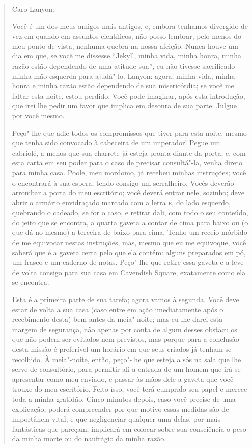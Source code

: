 \begin{quote}
Caro Lanyon:

Você é um dos meus amigos mais antigos, e, embora tenhamos divergido de
vez em quando em assuntos científicos, não posso lembrar, pelo menos do
meu ponto de vista, nenhuma quebra na nossa afeição. Nunca houve um dia
em que, se você me dissesse “Jekyll, minha vida, minha honra, minha
razão estão dependendo de uma atitude sua”, eu não tivesse sacrificado
minha mão esquerda para ajudá"-lo.  Lanyon: agora, minha vida, minha
honra e minha razão estão dependendo de sua misericórdia; se você me
faltar esta noite, estou perdido.  Você pode imaginar, após esta
introdução, que irei lhe pedir um favor que implica em desonra de sua
parte.  Julgue por você mesmo.

Peço"-lhe que adie todos os compromissos que tiver para esta noite, mesmo
que tenha sido convocado à cabeceira de um imperador!  Pegue um
cabriolé, a menos que sua charrete já esteja pronta diante da porta; e,
com esta carta em seu poder para o caso de precisar consultá"-la, venha
direto para minha casa.  Poole, meu mordomo, já recebeu minhas
instruções; você o encontrará à sua espera, tendo consigo um
serralheiro.  Vocês deverão arrombar a porta do meu escritório; você
deverá entrar nele, sozinho; deve abrir o armário envidraçado marcado
com a letra \textsc{e}, do lado esquerdo, quebrando o cadeado, se for o caso, e
retirar dali, com todo o seu conteúdo, do jeito que se encontra, a
quarta gaveta a contar de cima para baixo ou (o que dá no mesmo) a
terceira de baixo para cima.  Tenho um receio mórbido de me equivocar
nestas instruções, mas, mesmo que eu me equivoque, você saberá que é a
gaveta certa pelo que ela contém: alguns preparados em pó, um frasco e
um caderno de notas.  Peço"-lhe que retire essa gaveta e a leve de volta
consigo para sua casa em Cavendish Square, exatamente como ela se
encontra.

Esta é a primeira parte de sua tarefa; agora vamos à segunda.  Você deve
estar de volta a sua casa (caso entre em ação imediatamente após o
recebimento desta) bem antes da meia"-noite; mas eu lhe darei esta
margem de segurança, não apenas por conta de algum desses obstáculos
que não podem ser evitados nem previstos, mas porque para a conclusão
desta missão é preferível um horário em que seus criados já tenham se
recolhido.  À meia"-noite, então, peço"-lhe que esteja a sós na sala que
lhe serve de consultório, para permitir ali a entrada de um homem que
irá se apresentar como meu enviado, e passar às mãos dele a gaveta que
você trouxe do meu escritório.  Feito isso, você terá cumprido seu
papel e merece toda a minha gratidão.  Cinco minutos depois, caso você
precise de uma explicação, poderá compreender por que motivo essas
medidas são de importância vital; e que negligenciar qualquer uma
delas, por mais fantásticas que pareçam, implicará em colocar sobre sua
consciência o peso da minha morte ou do naufrágio da minha razão.


\end{quote}
